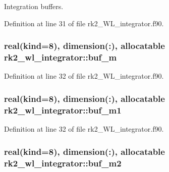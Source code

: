 Integration buffers. 



Definition at line 31 of file rk2\+\_\+\+W\+L\+\_\+integrator.\+f90.

\subsubsection[{\texorpdfstring{buf\+\_\+m}{buf_m}}]{\setlength{\rightskip}{0pt plus 5cm}real(kind=8), dimension(\+:), allocatable rk2\+\_\+wl\+\_\+integrator\+::buf\+\_\+m\hspace{0.3cm}{\ttfamily [private]}}\hypertarget{namespacerk2__wl__integrator_a744d43e9a769cad7dde659df50975e35}{}\label{namespacerk2__wl__integrator_a744d43e9a769cad7dde659df50975e35}


Definition at line 32 of file rk2\+\_\+\+W\+L\+\_\+integrator.\+f90.

\subsubsection[{\texorpdfstring{buf\+\_\+m1}{buf_m1}}]{\setlength{\rightskip}{0pt plus 5cm}real(kind=8), dimension(\+:), allocatable rk2\+\_\+wl\+\_\+integrator\+::buf\+\_\+m1\hspace{0.3cm}{\ttfamily [private]}}\hypertarget{namespacerk2__wl__integrator_a4be840fb90a95206b2740f5a0b31b83f}{}\label{namespacerk2__wl__integrator_a4be840fb90a95206b2740f5a0b31b83f}


Definition at line 32 of file rk2\+\_\+\+W\+L\+\_\+integrator.\+f90.

\subsubsection[{\texorpdfstring{buf\+\_\+m2}{buf_m2}}]{\setlength{\rightskip}{0pt plus 5cm}real(kind=8), dimension(\+:), allocatable rk2\+\_\+wl\+\_\+integrator\+::buf\+\_\+m2\hspace{0.3cm}{\ttfamily [private]}}\hypertarget{namespacerk2__wl__integrator_a86ad58f3281d4e047c2db27060d98d2f}{}\label{namespacerk2__wl__integrator_a86ad58f3281d4e047c2db27060d98d2f}


